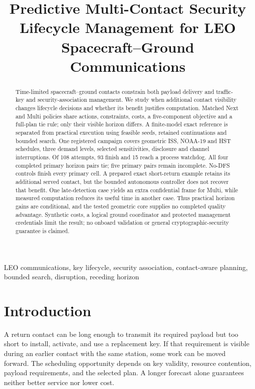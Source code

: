 \documentclass[conference]{IEEEtran}
\begin{document}
\title{Predictive Multi-Contact Security Lifecycle Management for LEO Spacecraft--Ground Communications}
\author{}
\maketitle

\begin{abstract}
Time-limited spacecraft--ground contacts constrain both payload delivery and traffic-key and security-association management. We study when additional contact visibility changes lifecycle decisions and whether its benefit justifies computation. Matched Next and Multi policies share actions, constraints, costs, a five-component objective and a full-plan tie rule; only their visible horizon differs. A finite-model exact reference is separated from practical execution using feasible seeds, retained continuations and bounded search. One registered campaign covers geometric ISS, NOAA-19 and HST schedules, three demand levels, selected sensitivities, disclosure and channel interruptions. Of 108 attempts, 93 finish and 15 reach a process watchdog. All four completed primary horizon pairs tie; five primary pairs remain incomplete. No-DFS controls finish every primary cell. A prepared exact short-return example retains its additional served contact, but the bounded autonomous controller does not recover that benefit. One late-detection case yields an extra confidential frame for Multi, while measured computation reduces its useful time in another case. Thus practical horizon gains are conditional, and the tested geometric core supplies no completed quality advantage. Synthetic costs, a logical ground coordinator and protected management credentials limit the result; no onboard validation or general cryptographic-security guarantee is claimed.
\end{abstract}
\begin{IEEEkeywords}
LEO communications, key lifecycle, security association, contact-aware planning, bounded search, disruption, receding horizon
\end{IEEEkeywords}

\section{Introduction}
A return contact can be long enough to transmit its required payload but too short to install, activate, and use a replacement key. If that requirement is visible during an earlier contact with the same station, some work can be moved forward. The scheduling opportunity depends on key validity, resource contention, payload requirements, and the selected plan. A longer forecast alone guarantees neither better service nor lower cost.
\end{document}
